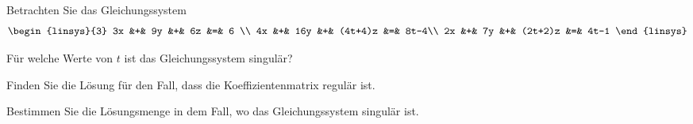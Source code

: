 Betrachten Sie das Gleichungssystem
\[
\begin{linsys}{3}
3x &+&  9y &+&      6z &=& 6   \\
4x &+& 16y &+& (4t+4)z &=& 8t-4\\
2x &+&  7y &+& (2t+2)z &=& 4t-1
\end{linsys}
\]
\begin{teilaufgaben}
\item
Für welche Werte von $t$ ist das Gleichungssystem singulär?
\item
Finden Sie die Lösung für den Fall, dass die Koeffizientenmatrix regulär ist.
\item
Bestimmen Sie die Lösungsmenge in dem Fall, wo das Gleichungssystem singulär
ist.
\end{teilaufgaben}




